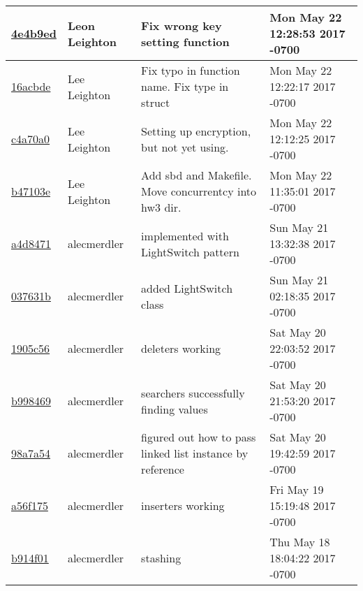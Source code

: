 \begin{tabular}{l l l l}
\href{https://github.com/alecmerdler/cs-444-group-119/commit/4e4b9edfb6e616abc68cf7963f7e457a6e639877}{4e4b9ed} & Leon Leighton & Fix wrong key setting function & Mon May 22 12:28:53 2017 -0700\\\hline
\href{https://github.com/alecmerdler/cs-444-group-119/commit/16acbde0f356cd3094ceac400a542ec2af2e2504}{16acbde} & Lee Leighton & Fix typo in function name. Fix type in struct & Mon May 22 12:22:17 2017 -0700\\\hline
\href{https://github.com/alecmerdler/cs-444-group-119/commit/c4a70a03960d0f45fd8e48b44bf6130091e49b23}{c4a70a0} & Lee Leighton & Setting up encryption, but not yet using. & Mon May 22 12:12:25 2017 -0700\\\hline
\href{https://github.com/alecmerdler/cs-444-group-119/commit/b47103eae18f8b74720f2bc8314e316d10f499fd}{b47103e} & Lee Leighton & Add sbd and Makefile. Move concurrentcy into hw3 dir. & Mon May 22 11:35:01 2017 -0700\\\hline
\href{https://github.com/alecmerdler/cs-444-group-119/commit/a4d8471b00b39d4a3ec09b301115d729bd457e45}{a4d8471} & alecmerdler & implemented with LightSwitch pattern & Sun May 21 13:32:38 2017 -0700\\\hline
\href{https://github.com/alecmerdler/cs-444-group-119/commit/037631b1e84e2f6ede48af92c8614ebad3ae7a4b}{037631b} & alecmerdler & added LightSwitch class & Sun May 21 02:18:35 2017 -0700\\\hline
\href{https://github.com/alecmerdler/cs-444-group-119/commit/1905c56c31be38dd846beec3c3fdb64f8422b3dc}{1905c56} & alecmerdler & deleters working & Sat May 20 22:03:52 2017 -0700\\\hline
\href{https://github.com/alecmerdler/cs-444-group-119/commit/b998469fd053a258a927eb707c2ab21a3e5fbc8e}{b998469} & alecmerdler & searchers successfully finding values & Sat May 20 21:53:20 2017 -0700\\\hline
\href{https://github.com/alecmerdler/cs-444-group-119/commit/98a7a54e6ad300bb0aa2091a752058fd9c108644}{98a7a54} & alecmerdler & figured out how to pass linked list instance by reference & Sat May 20 19:42:59 2017 -0700\\\hline
\href{https://github.com/alecmerdler/cs-444-group-119/commit/a56f175ef76e23fe5bd5bc18e80d0035b232c3e7}{a56f175} & alecmerdler & inserters working & Fri May 19 15:19:48 2017 -0700\\\hline
\href{https://github.com/alecmerdler/cs-444-group-119/commit/b914f01b2e1e4067dae21c9038ad410339656616}{b914f01} & alecmerdler & stashing & Thu May 18 18:04:22 2017 -0700\\\hline

\end{tabular}

